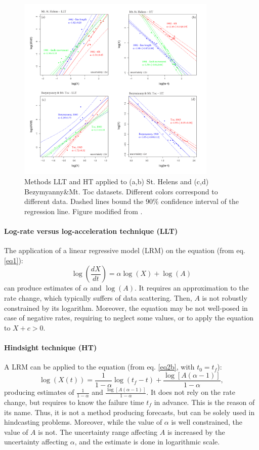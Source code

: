 \documentclass{article}
\begin{document}
\begin{figure}[H]
\centering
\includegraphics[width=0.85\textwidth]{Fig4_plus.png}
\vskip-0.5cm\caption{Methods LLT and HT applied to (a,b) St. Helens and (c,d) Bezymyanny\&Mt. Toc datasets. Different colors correspond to different data. Dashed lines bound the $90\%$ confidence interval of the regression line. Figure modified from \cite{Voight1988}.}
\label{Fig4}
\end{figure}

\paragraph{Log-rate versus log-acceleration technique (LLT)}
The application of a linear regressive model (LRM) on the equation (from eq. \ref{eq1}):
$$\log\left(\frac{dX}{dt}\right)=\alpha\log(X)+\log(A)$$
can produce estimates of $\alpha$ and $\log(A)$. It requires an approximation to the rate change, which typically suffers of data scattering. Then, $A$ is not robustly constrained by its logarithm. Moreover, the equation may be not well-posed in case of negative rates, requiring to neglect some values, or to apply the equation to $X+c > 0$.

\paragraph{Hindsight technique (HT)}
A LRM can be applied to the equation (from eq. \ref{eq2b}, with $t_0=t_f$):
$$\log(X(t))=\frac{1}{1-\alpha}\log(t_f-t)+\frac{\log[A(\alpha-1)]}{1-\alpha},$$
producing estimates of $\frac{1}{1-\alpha}$ and $\frac{\log[A(\alpha-1)]}{1-\alpha}$. It does not rely on the rate change, but requires to know the failure time $t_f$ in advance. This is the reason of its name. Thus, it is not a method producing forecasts, but can be solely used in hindcasting problems. Moreover, while the value of $\alpha$ is well constrained, the value of $A$ is not. The uncertainty range affecting $A$ is increased by the uncertainty affecting $\alpha$, and the estimate is done in logarithmic scale.
\end{document}
